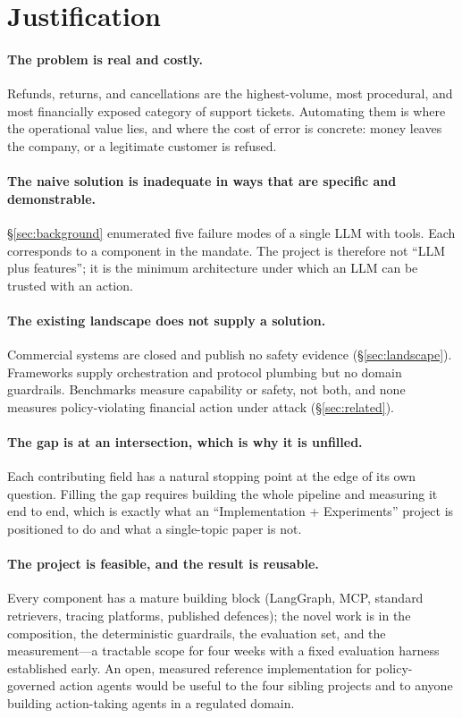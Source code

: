 \documentclass[11pt,a4paper]{article}
\begin{document}
\section{Justification}\label{sec:justification}

\paragraph{The problem is real and costly.} Refunds, returns, and cancellations are the highest-volume, most procedural, and most financially exposed category of support tickets. Automating them is where the operational value lies, and where the cost of error is concrete: money leaves the company, or a legitimate customer is refused.

\paragraph{The naive solution is inadequate in ways that are specific and demonstrable.} \S\ref{sec:background} enumerated five failure modes of a single LLM with tools. Each corresponds to a component in the mandate. The project is therefore not ``LLM plus features''; it is the minimum architecture under which an LLM can be trusted with an action.

\paragraph{The existing landscape does not supply a solution.} Commercial systems are closed and publish no safety evidence (\S\ref{sec:landscape}). Frameworks supply orchestration and protocol plumbing but no domain guardrails. Benchmarks measure capability or safety, not both, and none measures policy-violating financial action under attack (\S\ref{sec:related}).

\paragraph{The gap is at an intersection, which is why it is unfilled.} Each contributing field has a natural stopping point at the edge of its own question. Filling the gap requires building the whole pipeline and measuring it end to end, which is exactly what an ``Implementation + Experiments'' project is positioned to do and what a single-topic paper is not.

\paragraph{The project is feasible, and the result is reusable.} Every component has a mature building block (LangGraph, MCP, standard retrievers, tracing platforms, published defences); the novel work is in the composition, the deterministic guardrails, the evaluation set, and the measurement---a tractable scope for four weeks with a fixed evaluation harness established early. An open, measured reference implementation for policy-governed action agents would be useful to the four sibling projects and to anyone building action-taking agents in a regulated domain.
\end{document}
